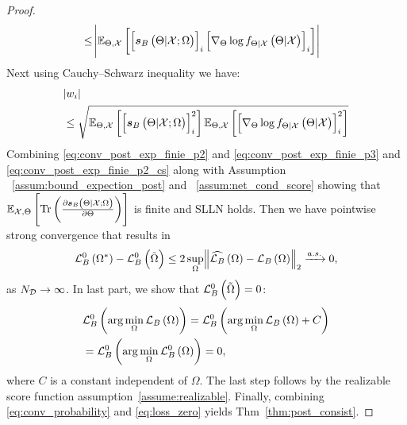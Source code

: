 \begin{proof}
{\begin{align}
       &\leq \abs{\expectation{\squareb{\postscore{\pr}{\xset;\Omega}}_i \squareb{\nabla_{\pr}\log\probt{\pr|\xset}{\pr|\xset}}_i}{\pr,\xset}}
    \end{align}
    Next using Cauchy–Schwarz inequality we have:
    \begin{align}\label{eq:conv_post_exp_finie_p2_cs}
        &\abs{w_i}\\
        &\leq \sqrt{\expectation{\squareb{\postscore{\pr}{\xset;\Omega}}_i^2}{\pr,\xset}\expectation{\squareb{\nabla_{\pr}\log\probt{\pr|\xset}{\pr|\xset}}_i^2}{\pr,\xset}}\nonumber
    \end{align}
    Combining \eqref{eq:conv_post_exp_finie_p2} and \eqref{eq:conv_post_exp_finie_p3} and \eqref{eq:conv_post_exp_finie_p2_cs} along with Assumption ~\ref{assum:bound_expection_post} and ~\ref{assum:net_cond_score} %
    showing that $\expectation{{\trace{\frac{\partial \postscore{\pr}{\xset;\Omega}}{\partial\pr}}}}{\xset,\pr}$ is finite and SLLN holds.
    }    
    Then we have pointwise strong convergence that results in
    \begin{equation}\label{eq:conv_probability}
        \lossbs\brackets{\Omega^*}-\lossbs\brackets{\tilde{\Omega}}\leq 2\sup\limits_{\Omega}\norm{\lossbsm\brackets{\Omega}-\lossbst\brackets{\Omega}}_2\xrightarrow{a.s.} 0,
    \end{equation}
    as $\nds\rightarrow\infty$.  In last part, we show that $\lossbs\brackets{\tilde{\Omega}}=0$:
    \begin{align}\label{eq:loss_zero}
        &\lossbs\brackets{\arg\min\limits_{\Omega}\lossbst\brackets{\Omega}}=\lossbs\brackets{\arg\min\limits_{\Omega}\lossbst\brackets{\Omega}+C}\nonumber\\
        &=\lossbs\brackets{\arg\min\limits_{\Omega}\lossbs\brackets{\Omega}}=0,
    \end{align}
    where $C$ is a constant independent of $\Omega$. The last step follows by the
    realizable score function assumption~\ref{assume:realizable}.  Finally, combining \eqref{eq:conv_probability} and \eqref{eq:loss_zero} yields Thm~\ref{thm:post_consist}. 
\end{proof}
